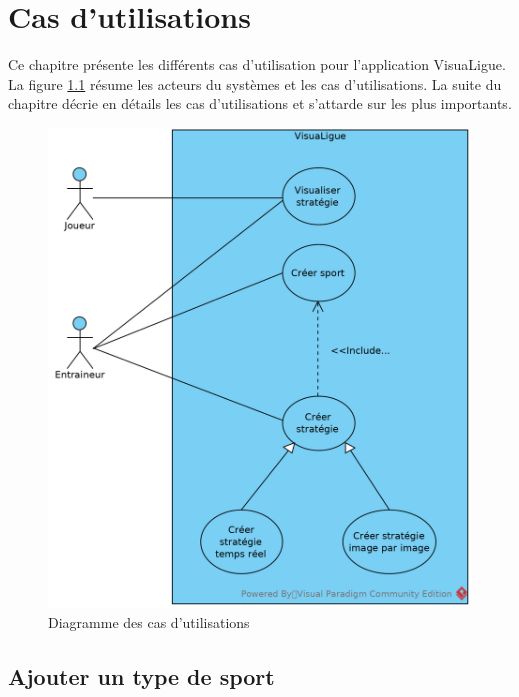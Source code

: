 
\chapter{Cas d'utilisations}
\label{s:cas_utilisation}

Ce chapitre présente les différents cas d'utilisation pour l'application VisuaLigue.
La figure \ref{fig:cas_utilisation_diag} résume les acteurs du systèmes et les cas d'utilisations.
La suite du chapitre décrie en détails les cas d'utilisations et s'attarde sur les plus importants.

\begin{figure}[htpb]
    \centering
    \includegraphics[scale=0.7]{fig/cas_utilisation_diag.png}
    \caption{Diagramme des cas d'utilisations}
    \label{fig:cas_utilisation_diag}
\end{figure}

\newpage

\section{Ajouter un type de sport}
\label{sec:ajouter_un_type_de_sport}

